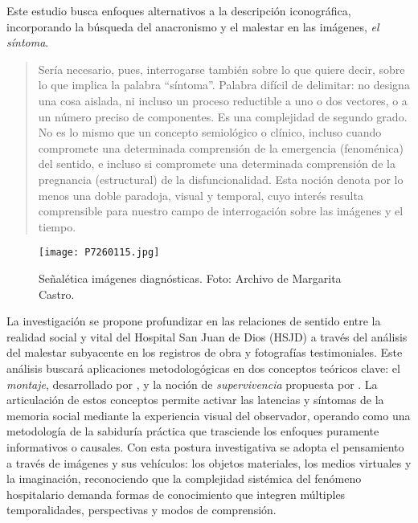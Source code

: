 Este estudio busca enfoques alternativos a la descripción iconográfica, incorporando la búsqueda del anacronismo y el malestar en las imágenes, \textit{el síntoma}.

\begin{quote}
    Sería necesario, pues, interrogarse también sobre lo que quiere decir, sobre lo que implica la palabra “síntoma”. Palabra difícil de delimitar: no designa una cosa aislada, ni incluso un proceso reductible a uno o dos vectores, o a un número preciso de componentes. Es una complejidad de segundo grado. No es lo mismo que un concepto semiológico o clínico, incluso cuando compromete una determinada comprensión de la emergencia (fenoménica) del sentido, e incluso si compromete una determinada comprensión de la pregnancia (estructural) de la disfuncionalidad. Esta noción denota por lo menos una doble paradoja, visual y temporal, cuyo interés resulta comprensible para nuestro campo de interrogación sobre las imágenes y el tiempo. \parencite[p. 63]{DidiHuberman2011}
\end{quote}

\begin{figure}[h!]
    \centering
    \texttt{[image: P7260115.jpg]}
    \caption{Señalética imágenes diagnósticas. Foto: Archivo de Margarita Castro.}
    \label{fig:senaletica_imagenes_diagnosticas}
\end{figure}

La investigación se propone profundizar en las relaciones de sentido entre la realidad social y vital del Hospital San Juan de Dios (HSJD) a través del análisis del malestar subyacente en los registros de obra y fotografías testimoniales. Este análisis buscará aplicaciones metodologógicas en dos conceptos teóricos clave: el \textit{montaje}, desarrollado por \parencite{Benjamin2004}, y la noción de \textit{supervivencia} propuesta por \parencite{Warburg2010}. La articulación de estos conceptos permite activar las latencias y síntomas de la memoria social mediante la experiencia visual del observador, operando como una metodología de la sabiduría práctica que trasciende los enfoques puramente informativos o causales. Con esta postura investigativa se adopta el pensamiento a través de imágenes y sus vehículos: los objetos materiales, los medios virtuales y la imaginación, reconociendo que la complejidad sistémica del fenómeno hospitalario demanda formas de conocimiento que integren múltiples temporalidades, perspectivas y modos de comprensión.

